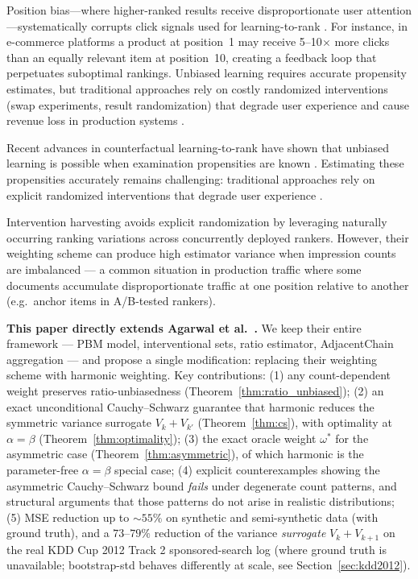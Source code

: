 \documentclass[sigconf]{acmart}
\begin{document}
Position bias—where higher-ranked results receive disproportionate user attention—systematically corrupts click signals used for learning-to-rank \cite{joachims2017unbiased}. For instance, in e-commerce platforms a product at position~1 may receive 5--10$\times$ more clicks than an equally relevant item at position~10, creating a feedback loop that perpetuates suboptimal rankings. Unbiased learning requires accurate propensity estimates, but traditional approaches rely on costly randomized interventions (swap experiments, result randomization) that degrade user experience and cause revenue loss in production systems \cite{joachims2017unbiased, wang2018position}.

Recent advances in counterfactual learning-to-rank have shown that unbiased learning is possible when examination propensities are known \cite{joachims2017unbiased}. Estimating these propensities accurately remains challenging: traditional approaches rely on explicit randomized interventions that degrade user experience \cite{wang2018position}.

Intervention harvesting \cite{agarwal2019estimating} avoids explicit randomization by leveraging naturally occurring ranking variations across concurrently deployed rankers. However, their weighting scheme can produce high estimator variance when impression counts are imbalanced --- a common situation in production traffic where some documents accumulate disproportionate traffic at one position relative to another (e.g.\ anchor items in A/B-tested rankers).

\textbf{This paper directly extends Agarwal et al.~\cite{agarwal2019estimating}.} We keep
their entire framework — PBM model, interventional sets, ratio estimator, AdjacentChain
aggregation — and propose a single modification: replacing their weighting scheme with
harmonic weighting. Key contributions: (1) any count-dependent weight preserves
ratio-unbiasedness (Theorem~\ref{thm:ratio_unbiased}); (2) an exact unconditional
Cauchy--Schwarz guarantee that harmonic reduces the symmetric variance surrogate
$V_k+V_{k'}$ (Theorem~\ref{thm:cs}), with optimality at $\alpha=\beta$
(Theorem~\ref{thm:optimality}); (3) the exact oracle weight $\omega^*$ for the asymmetric
case (Theorem~\ref{thm:asymmetric}), of which harmonic is the parameter-free
$\alpha=\beta$ special case; (4) explicit counterexamples showing the asymmetric
Cauchy--Schwarz bound \emph{fails} under degenerate count patterns, and structural
arguments that those patterns do not arise in realistic distributions; (5) MSE
reduction up to $\sim 55\%$ on synthetic and semi-synthetic data (with ground
truth), and a $73$--$79\%$ reduction of the variance \emph{surrogate} $V_k+V_{k+1}$
on the real KDD Cup 2012 Track 2 sponsored-search log (where ground truth is
unavailable; bootstrap-std behaves differently at scale, see Section~\ref{sec:kdd2012}).
\end{document}
